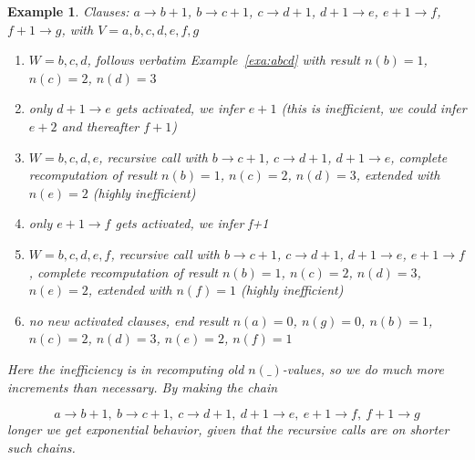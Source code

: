 \documentclass[11pt,a4paper]{article}
\newtheorem{example}{Example}[theorem]
\begin{document}
\begin{example}

Clauses: $a \to b+1$, $b \to c+1$, $c \to d+1$, $d+1 \to e$, $e+1 \to f$, $f+1 \to g$,
with $V = a,b,c,d,e,f,g$

\begin{enumerate}
\item $W = b,c,d$, 
follows verbatim Example~\ref{exa:abcd} with
result $n(b) = 1$, $n(c) = 2$, $n(d) = 3$

\item only $d+1 \to e$ gets activated, we infer $e+1$ (this is inefficient, we could
infer $e+2$ and thereafter $f+1$)

\item $W = b,c,d,e$,
recursive call with $b \to c+1$, $c \to d+1$, $d+1 \to e$,
complete recomputation of
result $n(b) = 1$, $n(c) = 2$, $n(d) = 3$, extended with $n(e) = 2$ (highly inefficient)

\item only $e+1 \to f$ gets activated, we infer f+1

\item $W = b,c,d,e,f$,
recursive call with $b \to c+1$, $c \to d+1$, $d+1 \to e$, $e+1 \to f$,
complete recomputation of
result $n(b) = 1$, $n(c) = 2$, $n(d) = 3$, $n(e) = 2$, extended with $n(f) = 1$
(highly inefficient)

\item no new activated clauses,
end result $n(a) = 0$, $n(g) = 0$, $n(b) = 1$, $n(c) = 2$, $n(d) = 3$, $n(e) = 2$, $n(f) = 1$

\end{enumerate}

\noindent
Here the inefficiency is in recomputing old $n(\_)$-values, so we do much
more increments than necessary. By making the chain

$$a\to b+1,~b\to c+1,~c\to d+1,~d+1 \to e,~e+1 \to f,~f+1 \to g$$
longer we get exponential behavior, 
given that the recursive calls are on shorter such chains.

\end{example}



\end{document}
